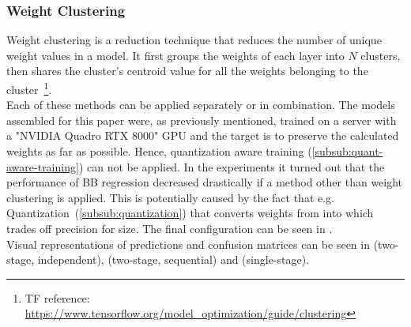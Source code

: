 \subsubsection{Weight Clustering}\label{subsub:weight-clustering}
Weight clustering is a reduction technique that reduces the number of unique weight values in a model.
It first groups the weights of each layer into $N$ clusters, then shares the cluster's centroid value for all the weights belonging to the cluster~\footnote{TF reference: \url{https://www.tensorflow.org/model_optimization/guide/clustering}}.\\\newline
Each of these methods can be applied separately or in combination.
The models assembled for this paper were, as previously mentioned, trained on a server with a "NVIDIA Quadro RTX 8000" GPU and the target is to preserve the calculated weights as far as possible.
Hence, quantization aware training (\ref{subsub:quant-aware-training}) can not be applied.
In the experiments it turned out that the performance of BB regression decreased drastically if a method other than weight clustering is applied.
This is potentially caused by the fact that e.g. Quantization~(\ref{subsub:quantization}) that converts weights from  into  which trades off precision for size.
The final configuration can be seen in .\\
Visual representations of predictions and confusion matrices can be seen in  (two-stage, independent),  (two-stage, sequential) and  (single-stage).

